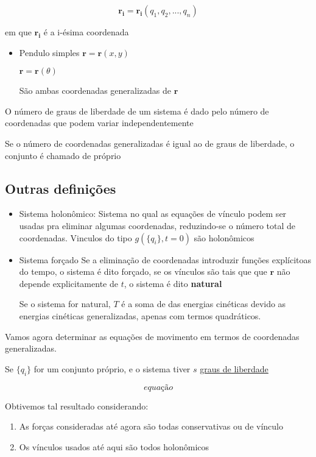 \documentclass[11pt]{article}
\begin{document}
\begin{equation}\label{eq:coordenadas generalizadas}
\mathbf{r_i} = \mathbf{r_i}(q_1, q_2, ..., q_n)
\end{equation}

em que \(\mathbf{r_i}\) é a i-ésima coordenada

\begin{itemize}
\item Pendulo simples
\(\mathbf{r} = \mathbf{r}(x,y)\)

\(\mathbf{r} = \mathbf{r}(\theta)\)

São ambas coordenadas generalizadas de \(\mathbf{r}\)
\end{itemize}

O número de graus de liberdade de um sistema é dado pelo número de
coordenadas que podem variar independentemente

Se o número de coordenadas generalizadas é igual ao de graus de liberdade, o
conjunto é chamado de próprio
\subsection{Outras definições}
\label{sec:org79fa48f}
\begin{itemize}
\item Sistema holonômico:
Sistema no qual as equações de vínculo podem ser usadas pra eliminar
algumas coordenadas, reduzindo-se o número total de coordenadas. Vinculos
do tipo \(g(\{q_i\},t = 0)\) são holonômicos
\item Sistema forçado
Se a eliminação de coordenadas introduzir funções explícitoas do tempo, o
sistema é dito forçado, se os vínculos são tais que que \(\mathbf{r}\)
não depende explicitamente de \(t\), o sistema é dito \textbf{natural}

Se o sistema for natural, \(T\) é a soma de das energias cinéticas devido as
energias cinéticas generalizadas, apenas com termos quadráticos.
\end{itemize}

Vamos agora determinar as equações de movimento em termos de coordenadas
generalizadas.

Se \(\{q_i\}\) for um conjunto próprio, e o sistema tiver \(s\) \uline{graus de liberdade}

  \begin{equation}
equação
  \end{equation}

Obtivemos tal resultado considerando:
\begin{enumerate}
\item As forças consideradas até agora são todas conservativas ou de vínculo
\item Os vínculos usados até aqui são todos holonômicos
\end{enumerate}
\end{document}
